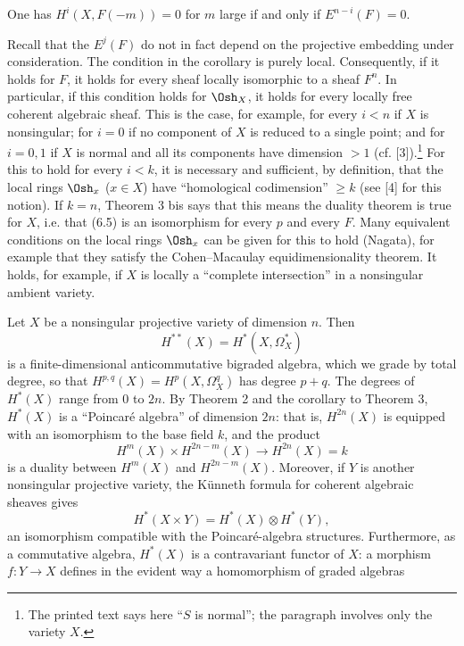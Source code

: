  One has $H^{i}(X,F(-m))=0$ for $m$ large if and only if
$E^{n-i}(F)=0$.

Recall that the $E^{j}(F)$ do not in fact depend on the projective embedding
under consideration. The condition in the corollary is purely local.
Consequently, if it holds for $F$, it holds for every sheaf locally isomorphic
to a sheaf $F^{n}$. In particular, if this condition holds for $\Osh_X$, it
holds for every locally free coherent algebraic sheaf. This is the case, for
example, for every $i<n$ if $X$ is nonsingular; for $i=0$ if no component of
$X$ is reduced to a single point; and for $i=0,1$ if $X$ is normal and all its
components have dimension $>1$ (cf. [3]).\footnote{The printed text says here
``$S$ is normal''; the paragraph involves only the variety $X$.} For this to
hold for every $i<k$, it is necessary and sufficient, by definition, that the
local rings $\Osh_x$ ($x\in X$) have ``homological codimension'' $\geq k$ (see
[4] for this notion). If $k=n$, Theorem 3 bis says that this means the duality
theorem is true for $X$, i.e. that (6.5) is an isomorphism for every $p$ and
every $F$. Many equivalent conditions on the local rings $\Osh_x$ can be given
for this to hold (Nagata), for example that they satisfy the Cohen--Macaulay
equidimensionality theorem. It holds, for example, if $X$ is locally a
``complete intersection'' in a nonsingular ambient variety.


Let $X$ be a nonsingular projective variety of dimension $n$. Then
\[
  H^{**}(X)=H^{*}(X,\Omega_X^{*})
\]
is a finite-dimensional anticommutative bigraded algebra, which we grade by
total degree, so that $H^{p,q}(X)=H^{p}(X,\Omega_X^{q})$ has degree $p+q$. The
degrees of $H^{*}(X)$ range from $0$ to $2n$. By Theorem 2 and the corollary to
Theorem 3, $H^{*}(X)$ is a ``Poincaré algebra'' of dimension $2n$: that is,
$H^{2n}(X)$ is equipped with an isomorphism to the base field $k$, and the
product
\[
  H^{m}(X)\times H^{2n-m}(X)\longrightarrow H^{2n}(X)=k
\]
is a duality between $H^{m}(X)$ and $H^{2n-m}(X)$. Moreover, if $Y$ is another
nonsingular projective variety, the Künneth formula for coherent algebraic
sheaves gives
\begin{equation}\tag{7.1}
  H^{*}(X\times Y)=H^{*}(X)\otimes H^{*}(Y),
\end{equation}
an isomorphism compatible with the Poincaré-algebra structures. Furthermore,
as a commutative algebra, $H^{*}(X)$ is a contravariant functor of $X$: a
morphism $f:Y\longrightarrow X$ defines in the evident way a homomorphism of
graded algebras

